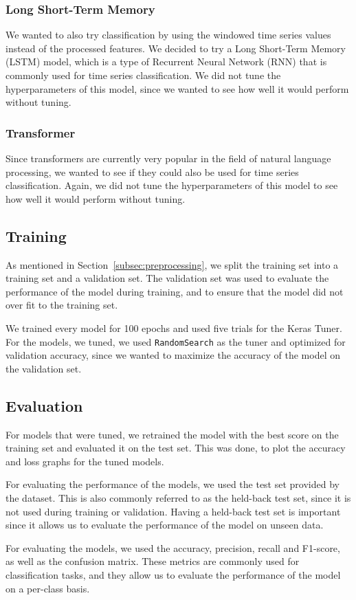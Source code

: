 \subsubsection{Long Short-Term Memory}

We wanted to also try classification by using the windowed time series values instead of the processed features.
We decided to try a Long Short-Term Memory (LSTM) model, which is a type of Recurrent Neural Network (RNN) that is commonly used for time series classification.
We did not tune the hyperparameters of this model, since we wanted to see how well it would perform without tuning.

\subsubsection{Transformer}

Since transformers are currently very popular in the field of natural language processing, we wanted to see if they could also be used for time series classification.
Again, we did not tune the hyperparameters of this model to see how well it would perform without tuning.

\subsection{Training}\label{subsec:training}

As mentioned in Section~\ref{subsec:preprocessing}, we split the training set into a training set and a validation set.
The validation set was used to evaluate the performance of the model during training, and to ensure that the model did not over fit to the training set.

We trained every model for 100 epochs and used five trials for the Keras Tuner.
For the models, we tuned, we used \texttt{RandomSearch} as the tuner and optimized for validation accuracy, since we wanted to maximize the accuracy of the model on the validation set.

\subsection{Evaluation}\label{subsec:evaluation}

For models that were tuned, we retrained the model with the best score on the training set and evaluated it on the test set.
This was done, to plot the accuracy and loss graphs for the tuned models.

For evaluating the performance of the models, we used the test set provided by the dataset.
This is also commonly referred to as the held-back test set, since it is not used during training or validation.
Having a held-back test set is important since it allows us to evaluate the performance of the model on unseen data.

For evaluating the models, we used the accuracy, precision, recall and F1-score, as well as the confusion matrix.
These metrics are commonly used for classification tasks, and they allow us to evaluate the performance of the model on a per-class basis.